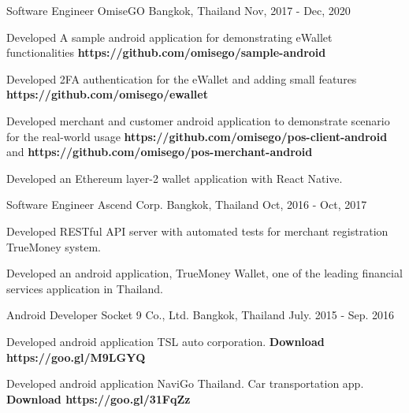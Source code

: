 

\begin{cventries}

  \cventry
    {Software Engineer}
    {OmiseGO}
    {Bangkok, Thailand}
    {Nov, 2017 - Dec, 2020}
    {
      \begin{cvitems}
        \item {Developed A sample android application for demonstrating eWallet functionalities \textbf{https://github.com/omisego/sample-android}}
        \item {Developed 2FA authentication for the eWallet and adding small features \textbf{https://github.com/omisego/ewallet}}
        \item {Developed merchant and customer android application to demonstrate scenario for the real-world usage \textbf{https://github.com/omisego/pos-client-android} and \textbf{https://github.com/omisego/pos-merchant-android}}
        \item {Developed an Ethereum layer-2 wallet application with React Native.}
      \end{cvitems}
    }

  \cventry
    {Software Engineer} %
    {Ascend Corp.} %
    {Bangkok, Thailand} %
    {Oct, 2016 - Oct, 2017} %
    {
      \begin{cvitems} %
        \item {Developed RESTful API server with automated tests for merchant registration TrueMoney system.}
        \item {Developed an android application, TrueMoney Wallet, one of the leading financial services application in Thailand.}
      \end{cvitems}
    }

  \cventry
    {Android Developer} %
    {Socket 9 Co., Ltd.} %
    {Bangkok, Thailand} %
    {July. 2015 - Sep. 2016} %
    {
      \begin{cvitems} %
        \item {Developed android application TSL auto corporation. \textbf{Download https://goo.gl/M9LGYQ}}
        \item {Developed android application NaviGo Thailand. Car transportation app. \textbf{Download https://goo.gl/31FqZz}}
      \end{cvitems}
    }

\end{cventries}
